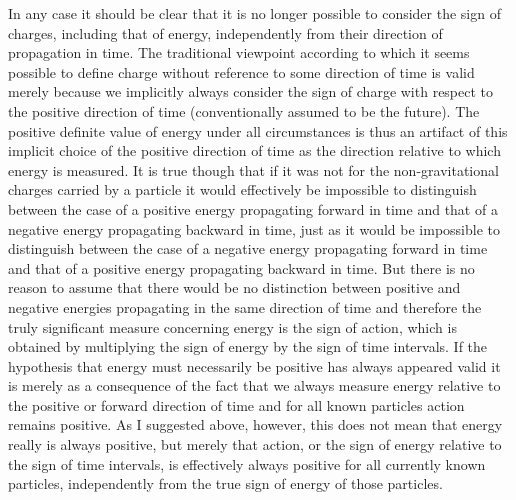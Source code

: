\documentclass[notitlepage,12pt]{report}
\begin{document}
In any case it should be clear that it is no longer possible to consider the sign of charges, including that of energy, independently from their direction of propagation in time. The traditional viewpoint according to which it seems possible to define charge without reference to some direction of time is valid merely because we implicitly always consider the sign of charge with respect to the positive direction of time (conventionally assumed to be the future). The positive definite value of energy under all circumstances is thus an artifact of this implicit choice of the positive direction of time as the direction relative to which energy is measured. It is true though that if it was not for the non-gravitational charges carried by a particle it would effectively be impossible to distinguish between the case of a positive energy propagating forward in time and that of a negative energy propagating backward in time, just as it would be impossible to distinguish between the case of a negative energy propagating forward in time and that of a positive energy propagating backward in time. But there is no reason to assume that there would be no distinction between positive and negative energies propagating in the same direction of time and therefore the truly significant measure concerning energy is the sign of action, which is obtained by multiplying the sign of energy by the sign of time intervals. If the hypothesis that energy must necessarily be positive has always appeared valid it is merely as a consequence of the fact that we always measure energy relative to the positive or forward direction of time and for all known particles action remains positive. As I suggested above, however, this does not mean that energy really is always positive, but merely that action, or the sign of energy relative to the sign of time intervals, is effectively always positive for all currently known particles, independently from the true sign of energy of those particles.
\end{document}

